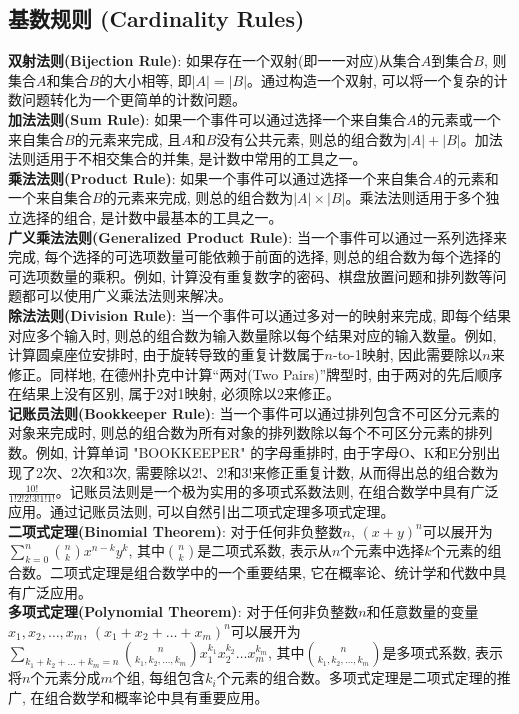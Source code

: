\documentclass[12pt, a4paper, UTF8]{ctexart}
\newcommand{\term}[1]{\textbf{\textcolor{blue!80!black}{#1}}}
\begin{document}
\begin{sloppypar}
    \subsection{基数规则 (Cardinality Rules)}
    \term{双射法则(Bijection Rule)}: 如果存在一个双射(即一一对应)从集合$A$到集合$B$, 则集合$A$和集合$B$的大小相等, 即$|A| = |B|$。通过构造一个双射, 可以将一个复杂的计数问题转化为一个更简单的计数问题。\\
    \term{加法法则(Sum Rule)}: 如果一个事件可以通过选择一个来自集合$A$的元素或一个来自集合$B$的元素来完成, 且$A$和$B$没有公共元素, 则总的组合数为$|A| + |B|$。加法法则适用于不相交集合的并集, 是计数中常用的工具之一。\\
    \term{乘法法则(Product Rule)}: 如果一个事件可以通过选择一个来自集合$A$的元素和一个来自集合$B$的元素来完成, 则总的组合数为$|A| \times |B|$。乘法法则适用于多个独立选择的组合, 是计数中最基本的工具之一。\\
    \term{广义乘法法则(Generalized Product Rule)}: 当一个事件可以通过一系列选择来完成, 每个选择的可选项数量可能依赖于前面的选择, 则总的组合数为每个选择的可选项数量的乘积。例如, 计算没有重复数字的密码、棋盘放置问题和排列数等问题都可以使用广义乘法法则来解决。\\
    \term{除法法则(Division Rule)}: 当一个事件可以通过多对一的映射来完成, 即每个结果对应多个输入时, 则总的组合数为输入数量除以每个结果对应的输入数量。例如, 计算圆桌座位安排时, 由于旋转导致的重复计数属于$n$-to-1映射, 因此需要除以$n$来修正。同样地, 在德州扑克中计算“两对(Two Pairs)”牌型时, 由于两对的先后顺序在结果上没有区别, 属于2对1映射, 必须除以2来修正。\\
    \term{记账员法则(Bookkeeper Rule)}: 当一个事件可以通过排列包含不可区分元素的对象来完成时, 则总的组合数为所有对象的排列数除以每个不可区分元素的排列数。例如, 计算单词 "BOOKKEEPER" 的字母重排时, 由于字母O、K和E分别出现了2次、2次和3次, 需要除以$2!$、$2!$和$3!$来修正重复计数, 从而得出总的组合数为$\frac{10!}{1!2!2!3!1!1!}$。记账员法则是一个极为实用的多项式系数法则, 在组合数学中具有广泛应用。通过记账员法则, 可以自然引出二项式定理多项式定理。\\
    \term{二项式定理(Binomial Theorem)}: 对于任何非负整数$n$, $(x + y)^n$可以展开为$\sum\limits_{k=0}^{n} \binom{n}{k} x^{n-k} y^k$, 其中$\binom{n}{k}$是二项式系数, 表示从$n$个元素中选择$k$个元素的组合数。二项式定理是组合数学中的一个重要结果, 它在概率论、统计学和代数中具有广泛应用。\\
    \term{多项式定理(Polynomial Theorem)}: 对于任何非负整数$n$和任意数量的变量$x_1, x_2, \dots, x_m$, $(x_1 + x_2 + \dots + x_m)^n$可以展开为$\sum\limits_{k_1 + k_2 + \dots + k_m = n} \binom{n}{k_1, k_2, \dots, k_m} x_1^{k_1} x_2^{k_2} \dots x_m^{k_m}$, 其中$\binom{n}{k_1, k_2, \dots, k_m}$是多项式系数, 表示将$n$个元素分成$m$个组, 每组包含$k_i$个元素的组合数。多项式定理是二项式定理的推广, 在组合数学和概率论中具有重要应用。\\

\end{sloppypar}
\end{document}
